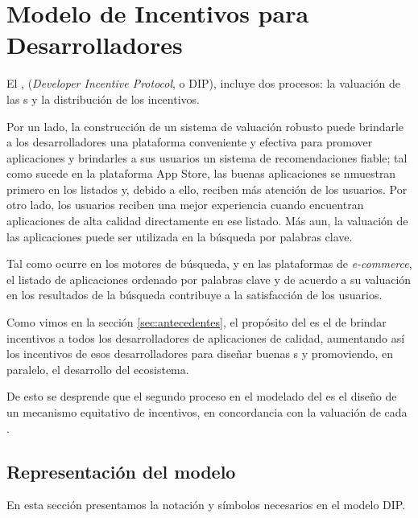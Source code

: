\section{Modelo de Incentivos para Desarrolladores}
\noindent
El \pidc, (\textit{Developer Incentive Protocol}, o DIP), incluye dos procesos: la valuación de las {\dapp}s y la distribución de los incentivos.

Por un lado, la construcción de un sistema de valuación robusto puede brindarle a los desarrolladores una plataforma conveniente y efectiva para promover aplicaciones y brindarles a sus usuarios un sistema de recomendaciones fiable; tal como sucede en la plataforma App Store, las buenas aplicaciones se nmuestran primero en los listados y, debido a ello, reciben más atención de los usuarios. Por otro lado, los usuarios reciben una mejor experiencia cuando encuentran aplicaciones de alta calidad directamente en ese listado. Más aun, la valuación de las aplicaciones puede ser utilizada en la búsqueda por palabras clave.

Tal como ocurre en los motores de búsqueda, y en las plataformas de \textit{e-commerce}, el listado de aplicaciones ordenado por palabras clave y de acuerdo a su valuación en los resultados de la búsqueda contribuye a la satisfacción de los usuarios.

Como vimos en la sección \ref{sec:antecedentes}, el propósito del \pidc es el de brindar incentivos a todos los desarrolladores de aplicaciones de calidad, aumentando así los incentivos de esos desarrolladores para diseñar buenas {\dapp}s y promoviendo, en paralelo, el desarrollo del ecosistema.

De esto se desprende que el segundo proceso en el modelado del \pidc es el diseño de un mecanismo equitativo de incentivos, en concordancia con la valuación de cada \dapp.

\subsection{Representación del modelo}
\label{subsection:parameters}
\noindent
En esta sección presentamos la notación y símbolos necesarios en el modelo DIP.

